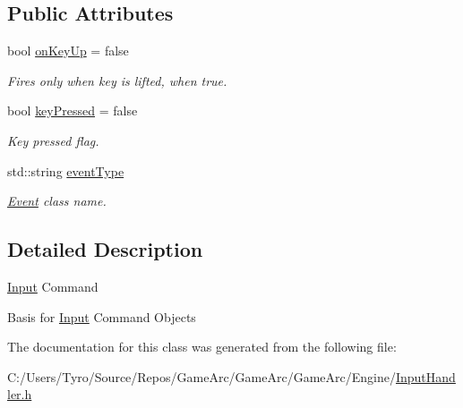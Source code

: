 \subsection*{Public Attributes}
\begin{DoxyCompactItemize}
\item 
\mbox{\label{class_input_command_a099c658ec29f0ec0cd3c30535c76b4a9}} 
bool \mbox{\hyperlink{class_input_command_a099c658ec29f0ec0cd3c30535c76b4a9}{on\+Key\+Up}} = false
\begin{DoxyCompactList}\small\item\em Fires only when key is lifted, when true. \end{DoxyCompactList}\item 
\mbox{\label{class_input_command_a64175f320e19197d623586f24a0cf2c1}} 
bool \mbox{\hyperlink{class_input_command_a64175f320e19197d623586f24a0cf2c1}{key\+Pressed}} = false
\begin{DoxyCompactList}\small\item\em Key pressed flag. \end{DoxyCompactList}\item 
\mbox{\label{class_input_command_a0b2bfae63bec459ea0df48dc0fc8ec36}} 
std\+::string \mbox{\hyperlink{class_input_command_a0b2bfae63bec459ea0df48dc0fc8ec36}{event\+Type}}
\begin{DoxyCompactList}\small\item\em \mbox{\hyperlink{class_event}{Event}} class name. \end{DoxyCompactList}\end{DoxyCompactItemize}


\subsection{Detailed Description}
\mbox{\hyperlink{class_input}{Input}} Command

Basis for \mbox{\hyperlink{class_input}{Input}} Command Objects 

The documentation for this class was generated from the following file\+:\begin{DoxyCompactItemize}
\item 
C\+:/\+Users/\+Tyro/\+Source/\+Repos/\+Game\+Arc/\+Game\+Arc/\+Game\+Arc/\+Engine/\mbox{\hyperlink{_input_handler_8h}{Input\+Handler.\+h}}\end{DoxyCompactItemize}
